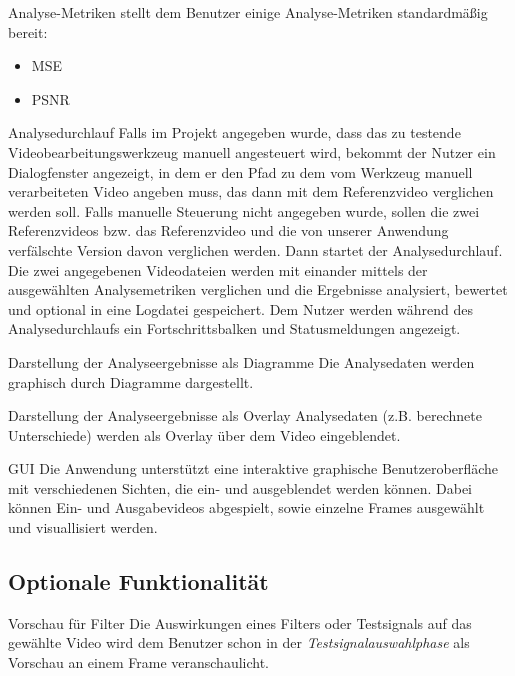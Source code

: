  Analyse-Metriken
\newline
\projektTitel stellt dem Benutzer einige Analyse-Metriken standardmäßig bereit:
\begin{itemize}
\item \gls{MSE}
\item \gls{PSNR}
\end{itemize}


 Analysedurchlauf
\newline
Falls im Projekt angegeben wurde, dass das zu testende Videobearbeitungswerkzeug manuell angesteuert wird, 
bekommt der Nutzer ein Dialogfenster angezeigt, in dem er den Pfad zu dem vom Werkzeug manuell verarbeiteten Video angeben muss, das dann mit dem Referenzvideo verglichen werden soll. Falls manuelle Steuerung nicht angegeben wurde, sollen die zwei Referenzvideos bzw. das Referenzvideo und die von unserer Anwendung verfälschte Version davon verglichen werden. Dann startet der Analysedurchlauf. Die zwei angegebenen Videodateien werden mit einander mittels der ausgewählten Analysemetriken verglichen und die Ergebnisse analysiert, bewertet und optional in eine Logdatei gespeichert. Dem Nutzer werden während des Analysedurchlaufs ein Fortschrittsbalken und Statusmeldungen angezeigt. 

 Darstellung der Analyseergebnisse als Diagramme
\newline
Die Analysedaten werden graphisch durch Diagramme dargestellt.

 Darstellung der Analyseergebnisse als Overlay
\newline
Analysedaten (z.B. berechnete Unterschiede) werden als Overlay über dem Video eingeblendet.


 GUI
\newline
Die Anwendung unterstützt eine interaktive graphische Benutzeroberfläche mit verschiedenen Sichten, die ein- und ausgeblendet werden können. Dabei können Ein- und Ausgabevideos abgespielt, sowie einzelne Frames ausgewählt und visuallisiert werden.





\subsection{Optionale Funktionalität}

 Vorschau für Filter
\newline
Die Auswirkungen eines Filters oder Testsignals auf das gewählte Video wird dem Benutzer schon in der \emph{Testsignalauswahlphase} als Vorschau an einem Frame veranschaulicht.


